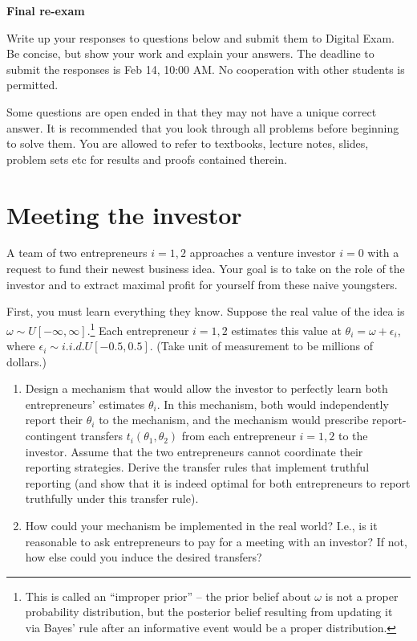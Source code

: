 \documentclass[a4paper]{article}
\newif\ifsolutions
\begin{document}
{\ifsolutions \else
	
\fi}

\begin{center}
		\LARGE\textbf{Final re-exam {\ifsolutions solutions \fi}}
\end{center}


Write up your responses to questions below and submit them to Digital Exam. Be concise, but show your work and explain your answers. The deadline to submit the responses is Feb 14, 10:00 AM. No cooperation with other students is permitted.

Some questions are open ended in that they may not have a unique correct answer. It is recommended that you look through all problems before beginning to solve them. You are allowed to refer to textbooks, lecture notes, slides, problem sets etc for results and proofs contained therein.




\section{Meeting the investor}

	A team of two entrepreneurs $i=1,2$ approaches a venture investor $i=0$ with a request to fund their newest business idea. Your goal is to take on the role of the investor and to extract maximal profit for yourself from these naive youngsters.
	
	First, you must learn everything they know. Suppose the real value of the idea is $\omega \sim U[-\infty, \infty]$.\footnote{This is called an ``improper prior'' -- the prior belief about $\omega$ is not a proper probability distribution, but the posterior belief resulting from updating it via Bayes' rule after an informative event would be a proper distribution.}
	Each entrepreneur $i=1,2$ estimates this value at $\theta_i = \omega + \epsilon_i$, where $\epsilon_i \sim i.i.d.U[-0.5,0.5]$. (Take unit of measurement to be millions of dollars.)
	
	\begin{enumerate}
		\item Design a mechanism that would allow the investor to perfectly learn both entrepreneurs' estimates $\theta_i$. In this mechanism, both would independently report their $\theta_i$ to the mechanism, and the mechanism would prescribe report-contingent transfers $t_i(\theta_1,\theta_2)$ from each entrepreneur $i=1,2$ to the investor. Assume that the two entrepreneurs cannot coordinate their reporting strategies. Derive the transfer rules that implement truthful reporting (and show that it is indeed optimal for both entrepreneurs to report truthfully under this transfer rule).
		
		\item How could your mechanism be implemented in the real world? I.e., is it reasonable to ask entrepreneurs to pay for a meeting with an investor? If not, how else could you induce the desired transfers?
	\end{enumerate}
\end{document}
